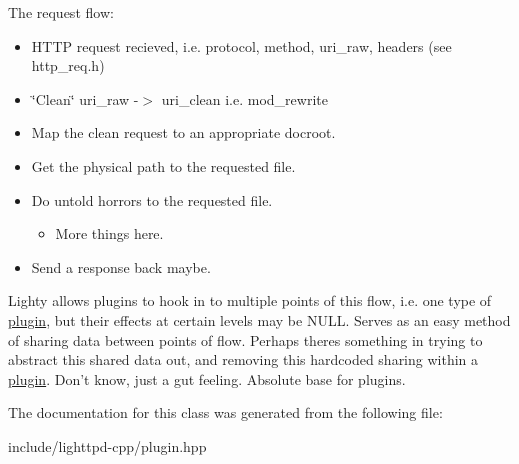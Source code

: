 The request flow:\begin{itemize}
\item HTTP request recieved, i.e. protocol, method, uri\_\-raw, headers (see http\_\-req.h)\item \char`\"{}Clean\char`\"{} uri\_\-raw -$>$ uri\_\-clean i.e. mod\_\-rewrite\item Map the clean request to an appropriate docroot.\item Get the physical path to the requested file.\item Do untold horrors to the requested file.\begin{itemize}
\item More things here.\end{itemize}
\item Send a response back maybe.\end{itemize}


Lighty allows plugins to hook in to multiple points of this flow, i.e. one type of \hyperlink{structplugin}{plugin}, but their effects at certain levels may be NULL. Serves as an easy method of sharing data between points of flow. Perhaps theres something in trying to abstract this shared data out, and removing this hardcoded sharing within a \hyperlink{structplugin}{plugin}. Don't know, just a gut feeling. Absolute base for plugins. 

The documentation for this class was generated from the following file:\begin{CompactItemize}
\item 
include/lighttpd-cpp/plugin.hpp\end{CompactItemize}
